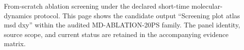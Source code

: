 From-scratch ablation screening under the declared short-time molecular-dynamics protocol. This page shows the candidate output ``Screening plot atlas msd dxy'' within the audited MD-ABLATION-20PS family. The panel identity, source scope, and current status are retained in the accompanying evidence matrix.
